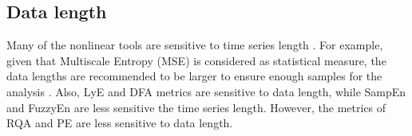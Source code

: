 %
%




\subsection{Data length}
Many of the nonlinear tools are sensitive to time series length 
\citep{caballero2014}.
For example, given that Multiscale Entropy (MSE) is considered as 
statistical measure, the data lengths are recommended to be larger to ensure 
enough samples for the analysis \citep{costa2007}. 
Also, LyE \citep{wolf1985} and  DFA \citep{peng1995} metrics are sensitive 
to data length, while SampEn \citep{rhea2011} and FuzzyEn 
\citep{richman2000, chen2007} are less sensitive the time series length.
However, the metrics of RQA \citep{webber1994, riley1999, wijnants2009}
and PE \citep{zunino2009} are less sensitive to data length.


